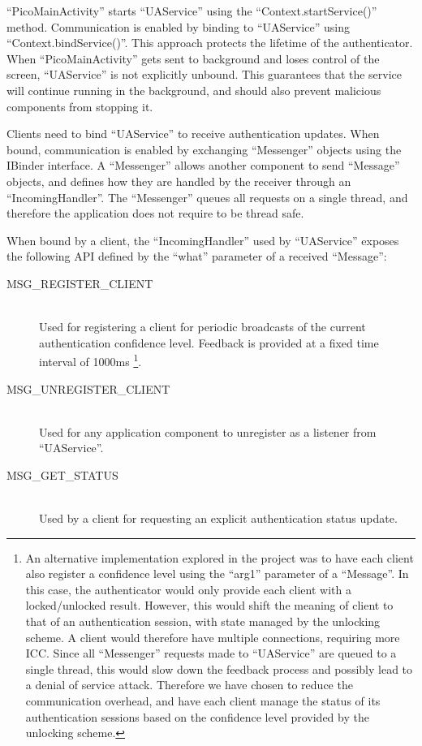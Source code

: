 ``PicoMainActivity'' starts ``UAService'' using the ``Context.startService()'' method. Communication is enabled by binding to ``UAService'' using ``Context.bindService()''. This approach protects the lifetime of the authenticator. When ``PicoMainActivity'' gets sent to background and loses control of the screen, ``UAService'' is not explicitly unbound. This guarantees that the service will continue running in the background, and should also prevent malicious components from stopping it. 

Clients need to bind ``UAService'' to receive authentication updates. When bound, communication is enabled by exchanging ``Messenger'' objects using the IBinder interface. A ``Messenger'' allows another component to send ``Message'' objects, and defines how they are handled by the receiver through an ``IncomingHandler''. The ``Messenger'' queues all requests on a single thread, and therefore the application does not require to be thread safe. 

When bound by a client, the ``IncomingHandler'' used by ``UAService''  exposes the following API defined by the ``what'' parameter of a received ``Message'': 
\begin{description}
  \item[MSG\_REGISTER\_CLIENT] \hfill \\
  Used for registering a client for periodic broadcasts of the current authentication confidence level. Feedback is provided at a fixed time interval of 1000ms \footnote{An alternative implementation explored in the project was to have each client also register a confidence level using the ``arg1'' parameter of a ``Message''. In this case, the authenticator would only provide each client with a locked/unlocked result. However, this would shift the meaning of client to that of an authentication session, with state managed by the unlocking scheme. A client would therefore have multiple connections, requiring more ICC. Since all ``Messenger'' requests made to ``UAService'' are queued to a single thread, this would slow down the feedback process and possibly lead to a denial of service attack. Therefore we have chosen to reduce the communication overhead, and have each client manage the status of its authentication sessions based on the confidence level provided by the unlocking scheme.}.

  \item[MSG\_UNREGISTER\_CLIENT] \hfill \\
  Used for any application component to unregister as a listener from ``UAService''.
  
  \item[MSG\_GET\_STATUS] \hfill \\
  Used by a client for requesting an explicit authentication status update.
\end{description}

